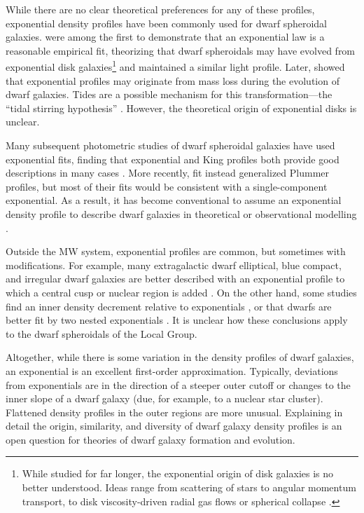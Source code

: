 While there are no clear theoretical preferences for any of these
profiles, exponential density profiles have been commonly used for dwarf
spheroidal galaxies. \citet{faber+lin1983} were among the first to
demonstrate that an exponential law is a reasonable empirical fit,
theorizing that dwarf spheroidals may have evolved from exponential disk
galaxies\footnote{While studied for far longer, the exponential origin
  of disk galaxies is no better understood. Ideas range from scattering
  of stars \citep{elmegreen+struck2013, wu+2022} to angular momentum
  transport, to disk viscosity-driven radial gas flows
  \citep{lin+pringle1987, wang+lilly2022} or spherical collapse
  \citep{freeman1970}.} and maintained a similar light profile. Later,
\citet{read+gilmore2005} showed that exponential profiles may originate
from mass loss during the evolution of dwarf galaxies. Tides are a
possible mechanism for this transformation---the ``tidal stirring
hypothesis'' \citep{mayer+2001a, klimentowski+2009}. However, the
theoretical origin of exponential disks is unclear.

Many subsequent photometric studies of dwarf spheroidal galaxies have
used exponential fits, finding that exponential and King profiles both
provide good descriptions in many cases
\citep{binggeli+sandage+tarenghi1984, mateo1998, mcconnachie+irwin2006, cicuendez+2018}.
More recently, \citet{moskowitz+walker2020} fit instead generalized
Plummer profiles, but most of their fits would be consistent with a
single-component exponential. As a result, it has become conventional to
assume an exponential density profile to describe dwarf galaxies in
theoretical or observational modelling
\citep[e.g.,][]{kowalczyk+2013, martin+2016, MV2020a, battaglia+2022}.

Outside the MW system, exponential profiles are common, but sometimes
with modifications. For example, many extragalactic dwarf elliptical,
blue compact, and irregular dwarf galaxies are better described with an
exponential profile to which a central cusp or nuclear region is added
\citep{caldwell+bothun1987, noeske+2003}. On the other hand, some
studies find an inner density decrement relative to exponentials
\citep[e.g.,][]{caldwell+1992, makarov+2012}, or that dwarfs are better
fit by two nested exponentials
\citep[e.g.,][]{aparicio+1997, graham+guzman2003, hunter+elmegreen2006, lee+2018}.
It is unclear how these conclusions apply to the dwarf spheroidals of
the Local Group.

Altogether, while there is some variation in the density profiles of
dwarf galaxies, an exponential is an excellent first-order
approximation. Typically, deviations from exponentials are in the
direction of a steeper outer cutoff or changes to the inner slope of a
dwarf galaxy (due, for example, to a nuclear star cluster). Flattened
density profiles in the outer regions are more unusual. Explaining in
detail the origin, similarity, and diversity of dwarf galaxy density
profiles is an open question for theories of dwarf galaxy formation and
evolution.

